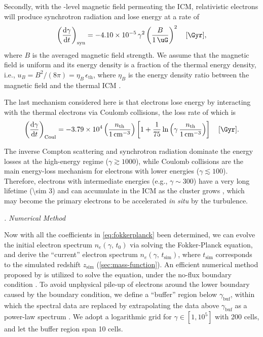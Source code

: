 \documentclass[modern]{aastex62}
\newcommand{\R}[1]{\mathrm{#1}}
\newcommand{\D}[1]{\R{d} #1}
\newcommand{\diff}[2]{\frac{\D{#1}}{\D{#2}}}
\newcounter{sssseccount}
\newcommand{\sssseclabel}{\alph{sssseccount}}
\newcommand{\ssssec}[1]{%
  \vspace{1ex}%
  \stepcounter{sssseccount}%
  \noindent\emph{\sssseclabel. #1}%
}
\begin{document}
Secondly, with the \si{\uG}-level magnetic field permeating the ICM,
relativistic electrons will produce synchrotron radiation and lose
energy at a rate of
\begin{equation}
  \label{eq:eloss-syn}
  \left( \diff{\gamma}{t} \right)_{\R{syn}} =
    \num{-4.10e-5} \,\gamma^2 \left( \frac{B}{\SI{1}{\uG}} \right)^2
    \quad [\si{\per\Gyr}],
\end{equation}
where $B$ is the averaged magnetic field strength.
We assume that the magnetic field is uniform and its energy density
is a fraction of the thermal energy density, i.e.,
$u_B = B^2 / (8\pi) = \eta_B \,\epsilon_{\R{th}}$,
where $\eta_B$ is the energy density ratio between the magnetic field
and the thermal ICM \citep[e.g.,][]{bohringer2016}.

The last mechanism considered here is that electrons lose energy by
interacting with the thermal electrons via Coulomb collisions, the
loss rate of which is
\begin{equation}
  \label{eq:eloss-coul}
  \left( \diff{\gamma}{t} \right)_{\R{Coul}} =
    \num{-3.79e4} \left( \frac{n_{\R{th}}}{\SI{1}{\per\cm\cubed}} \right)
    \left[ 1 + \frac{1}{75} \ln \left(
        \gamma \,\frac{n_{\R{th}}}{\SI{1}{\per\cm\cubed}} \right) \right]
    \quad [\si{\per\Gyr}].
\end{equation}

The inverse Compton scattering and synchrotron radiation dominate
the energy losses at the high-energy regime ($\gamma \gtrsim 1000$),
while Coulomb collisions are the main energy-loss mechanism for electrons
with lower energies ($\gamma \lesssim 100$).
Therefore, electrons with intermediate energies (e.g., $\gamma \sim 300$)
have a very long lifetime (\SI{\sim 3}{\Gyr}) and can accumulate in the
ICM as the cluster grows \citep{sarazin1999}, which may become the primary
electrons to be accelerated \textit{in situ} by the turbulence.

\ssssec{Numerical Method}

Now with all the coefficients in \autoref{eq:fokkerplanck} been determined,
we can evolve the initial electron spectrum $n_e(\gamma,\, t_0)$ via
solving the Fokker-Planck equation, and derive the \enquote{current}
electron spectrum $n_e(\gamma,\, t_{\R{sim}})$,
where $t_{\R{sim}}$ corresponds to the simulated redshift $z_{\R{sim}}$
(\autoref{sec:mass-function}).
An efficient numerical method proposed by \citet{chang1970} is utilized
to solve the equation, under the no-flux boundary condition \citep{park1996}.
To avoid unphysical pile-up of electrons around the lower boundary caused
by the boundary condition,
we define a \enquote{buffer} region below $\gamma_{\R{buf}}$, within which
the spectral data are replaced by extrapolating the data above
$\gamma_{\R{buf}}$ as a power-law spectrum \citep{donnert2014}.
We adopt a logarithmic grid for $\gamma \in [1, 10^5]$ with 200 cells,
and let the buffer region span 10 cells.
\end{document}
